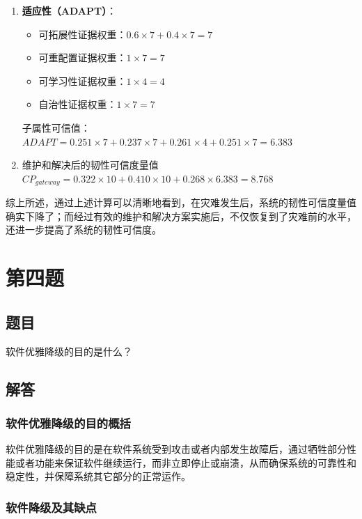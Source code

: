 \documentclass{article}
\begin{document}
\begin{enumerate}
\begin{enumerate}
		\item \textbf{适应性（ADAPT）}：
		\begin{itemize}
			\item 可拓展性证据权重：$0.6 \times 7 + 0.4 \times 7 = 7$
			\item 可重配置证据权重：$1 \times 7 = 7$
			\item 可学习性证据权重：$1 \times 4 = 4$
			\item 自治性证据权重：$1 \times 7 = 7$
		\end{itemize}
		子属性可信值：
		$ ADAPT = 0.251 \times 7 + 0.237 \times 7 + 0.261 \times 4 + 0.251 \times 7 = 6.383 $
		
		\item 维护和解决后的韧性可信度量值 
		$ CP_{gateway} = 0.322 \times 10 + 0.410 \times 10 + 0.268 \times 6.383 = 8.768 $
	\end{enumerate}
\end{enumerate}

综上所述，通过上述计算可以清晰地看到，在灾难发生后，系统的韧性可信度量值确实下降了；而经过有效的维护和解决方案实施后，不仅恢复到了灾难前的水平，还进一步提高了系统的韧性可信度。

\section{第四题}

\subsection{题目}

软件优雅降级的目的是什么？

\subsection{解答}

\subsubsection{软件优雅降级的目的概括}

软件优雅降级的目的是在软件系统受到攻击或者内部发生故障后，通过牺牲部分性能或者功能来保证软件继续运行，而非立即停止或崩溃，从而确保系统的可靠性和稳定性，并保障系统其它部分的正常运作。

\subsubsection{软件降级及其缺点}
\end{document}
